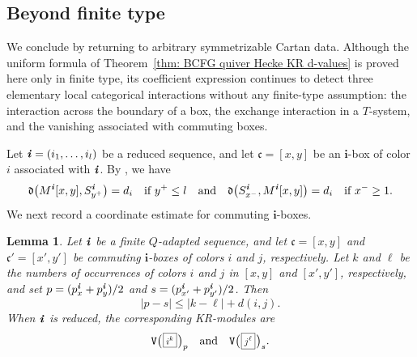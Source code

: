\documentclass[12pt, leqno]{amsart}
\numberwithin{equation}{section}
\theoremstyle{plain}
\newtheorem{lemma}{Lemma}[section]
\theoremstyle{definition}
\newcommand{\Vkm}[1]{%
  \ttV\bigl(\hspace{0.2ex}\scalebox{.8}{\(\boxed{#1}\)}\hspace{0.2ex}\bigr)%
}
\newcommand{\de}{\mathfrak{d}}
\newcommand{\ii}{ \textbf{\textit{i}}}
\newcommand{\frakc}{\mathfrak{c}}
\newcommand{\bfi}{\mathbf{i}}
\newcommand{\ttV}{\mathtt{V}}
\newcommand{\qtq}[1][{and}]{\quad\text{{#1}}\quad}
\begin{document}
\subsection{Beyond finite type}
\label{subsec: beyond finite type}

We conclude by returning to arbitrary symmetrizable Cartan data.
Although the uniform formula of
Theorem~\ref{thm: BCFG quiver Hecke KR d-values} is proved here only
in finite type, its coefficient expression continues to detect three
elementary local categorical interactions without any finite-type
assumption: the interaction across the boundary of a box, the exchange
interaction in a \(T\)-system, and the vanishing associated with
commuting boxes.

 Let \(\ii=(i_1,\ldots,i_l)\) be a reduced sequence, and let
\(\frakc=[x,y]\) be an \(\bfi\)-box of color \(i\) associated
with \(\ii\).   By
\cite[Lemma~5.8]{KK24}, we have
\begin{align}\label{eq: boundary}
\de\bigl(M^\ii[x,y],S^\ii_{y^+}\bigr)=d_i
\quad \text{if }y^+\leq l \qtq  \de\bigl(S^\ii_{x^-},M^\ii[x,y]\bigr)=d_i
\quad \text{if }x^-\geq1.
\end{align}
We next record a coordinate estimate for commuting
\(\bfi\)-boxes. 

\begin{lemma}
\label{lem: commuting boxes coordinate inequality}
Let \(\ii\) be a finite \(Q\)-adapted sequence, and let
\(\frakc=[x,y]\) and \(\frakc'=[x',y']\) be commuting
\(\bfi\)-boxes of colors \(i\) and \(j\), respectively.  Let \(k\) and \(\ell\) be the numbers of occurrences of colors
\(i\) and \(j\) in \([x,y]\) and \([x',y']\), respectively, and set
\(p=(p_x^\ii+p_y^\ii)/2\) and
\(s=(p_{x'}^\ii+p_{y'}^\ii)/2\).
Then
\[
|p-s|\leq |k-\ell|+d(i,j).
\]
When \(\ii\) is reduced, the corresponding KR-modules are 
\[
\Vkm{i^k}_p
\qtq
\Vkm{j^\ell}_s.
\]
\end{lemma}
\end{document}
